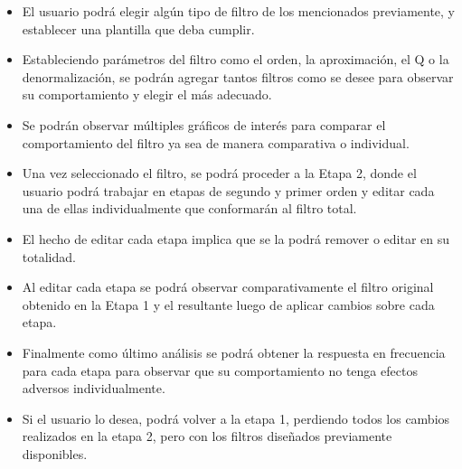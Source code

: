 \begin{itemize}
	\item El usuario podrá elegir algún tipo de filtro de los mencionados previamente, y establecer una plantilla que deba cumplir.
	\item Estableciendo parámetros del filtro como el orden, la aproximación, el Q o la denormalización, se podrán agregar tantos filtros como se desee para observar su comportamiento y elegir el más adecuado.
	\item Se podrán observar múltiples gráficos de interés para comparar el comportamiento del filtro ya sea de manera comparativa o individual.
	\item Una vez seleccionado el filtro, se podrá proceder a la Etapa 2, donde el usuario podrá trabajar en etapas de segundo y primer orden y editar cada una de ellas individualmente que conformarán al filtro total.
	\item El hecho de editar cada etapa implica que se la podrá remover o editar en su totalidad.
	\item Al editar cada etapa se podrá observar comparativamente el filtro original obtenido en la Etapa 1 y el resultante luego de aplicar cambios sobre cada etapa.
	\item Finalmente como último análisis se podrá obtener la respuesta en frecuencia para cada etapa para observar que su comportamiento no tenga efectos adversos individualmente.
	\item Si el usuario lo desea, podrá volver a la etapa 1, perdiendo todos los cambios realizados en la etapa 2, pero con los filtros diseñados previamente disponibles. 
\end{itemize}

